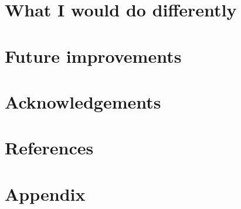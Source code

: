 \documentclass[11pt]{report}
\begin{document}
    \section{What I would do differently}\label{sec:different}

    \section{Future improvements}\label{sec:improvements}

    \section{Acknowledgements}\label{sec:acknowledgements}

    \section{References}\label{sec:references}

    \section{Appendix}\label{sec:appendix}
\end{document}

